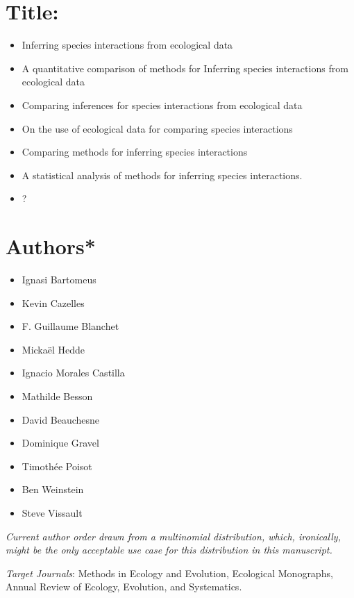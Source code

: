 



\section{Title:}\label{title}

\begin{itemize}
  \item Inferring species interactions from ecological data
  \item A quantitative comparison of methods for Inferring species interactions
  from ecological data
\item Comparing inferences for species interactions from ecological data
\item On the use of ecological data for comparing species interactions
\item Comparing methods for inferring species interactions
\item A statistical analysis of methods for inferring species interactions.
\item ?
\end{itemize}

\section{Authors*}\label{authors}

\begin{itemize}
  \item Ignasi Bartomeus
  \item Kevin Cazelles
  \item F. Guillaume Blanchet
  \item Mickaël Hedde
  \item Ignacio Morales Castilla
  \item Mathilde Besson
  \item David Beauchesne
  \item Dominique Gravel
  \item Timothée Poisot
  \item Ben Weinstein
  \item Steve Vissault
\end{itemize}

\emph{Current author order drawn from a multinomial distribution, which,
ironically, might be the only acceptable use case for this distribution in this
manuscript.}

\emph{Target Journals}: Methods in Ecology and Evolution, Ecological Monographs,
Annual Review of Ecology, Evolution, and Systematics.

